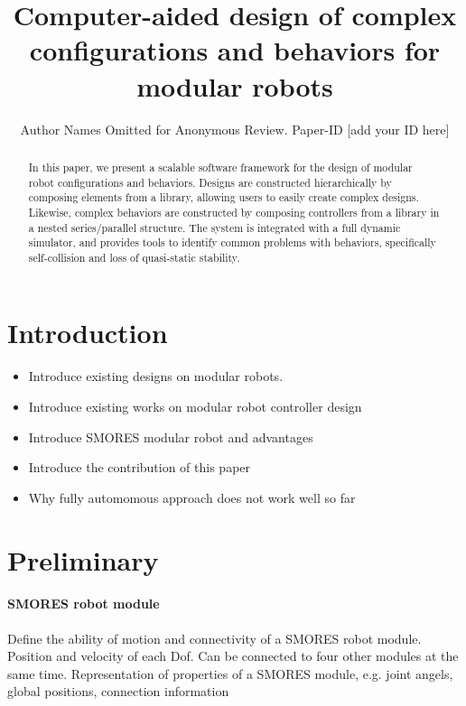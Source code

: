 \documentclass[conference]{IEEEtran}
\begin{document}
\title{Computer-aided design of complex configurations and behaviors for modular robots}

\author{Author Names Omitted for Anonymous Review. Paper-ID [add your ID here]}

\maketitle

\begin{abstract}
In this paper, we present a scalable software framework for the design of modular robot configurations and behaviors. Designs are constructed hierarchically by composing elements from a library, allowing users to easily create complex designs.  Likewise, complex behaviors are constructed by composing controllers from a library in a nested series/parallel structure. The system is integrated with a full dynamic simulator, and provides tools to identify common problems with behaviors, specifically self-collision and loss of quasi-static stability.

\end{abstract}

\section{Introduction}
\begin{itemize}
\item Introduce existing designs on modular robots.
\item Introduce existing works on modular robot controller design
\item Introduce SMORES modular robot and advantages
\item Introduce the contribution of this paper
\item Why fully automomous approach does not work well so far
\end{itemize}


\section{Preliminary}

\paragraph{SMORES robot module}
Define the ability of motion and connectivity of a SMORES robot module. Position and velocity of each Dof. Can be connected to four other modules at the same time. Representation of properties of a SMORES module, e.g. joint angels, global positions, connection information
\end{document}

